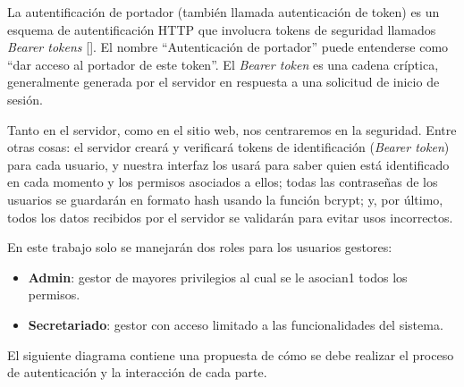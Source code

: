 
La autentificación de portador (también llamada autenticación de token) es un esquema de autentificación HTTP que involucra tokens de seguridad llamados \textit{Bearer tokens} [\cite{98}]. El nombre ``Autenticación de portador'' puede entenderse como ``dar acceso al portador de este token''. El \textit{Bearer token} es una cadena críptica, generalmente generada por el servidor en respuesta a una solicitud de inicio de sesión.

Tanto en el servidor, como en el sitio web, nos centraremos en la seguridad. Entre otras cosas: el servidor creará y verificará tokens de identificación (\textit{Bearer token}) para cada usuario, y nuestra interfaz los usará para saber quien está identificado en cada momento y los permisos asociados a ellos; todas las contraseñas de los usuarios se guardarán en formato hash usando la función bcrypt; y, por último, todos los datos recibidos por el servidor se validarán para evitar usos incorrectos.

En este trabajo solo se manejarán dos roles para los usuarios gestores:

\begin{itemize}
\item \textbf{Admin}: gestor de mayores privilegios al cual se le asocian1 todos los permisos.
\item \textbf{Secretariado}: gestor con acceso limitado a las funcionalidades del sistema.
\end{itemize}


El siguiente diagrama contiene una propuesta de cómo se debe realizar el proceso de autenticación y la interacción de cada parte.

